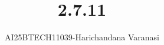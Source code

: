 \documentclass[journal]{IEEEtran}
\begin{document}

\vspace{3cm}

\title{2.7.11}
\author{AI25BTECH11039-Harichandana Varanasi}
 \maketitle
{\let\newpage\relax\maketitle}

\renewcommand{\thefigure}{\theenumi}
\renewcommand{\thetable}{\theenumi}
\setlength{\intextsep}{10pt} %


\renewcommand{\thetable}{\theenumi}



\date{}
\end{document}
